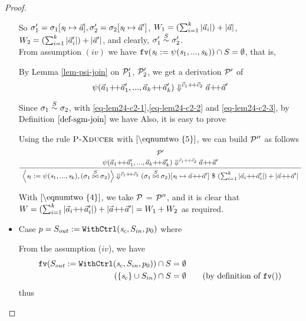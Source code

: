 \begin{proof}
\begin{itemize}
	So  $\sgm_1' = \sgm_1[\s_l \|-> \a], \sgm_2' = \sgm_2[\s_l \|-> \a']$, $W_1 = (\sum_{i=1}^{k}|\vec a_i|) + |\vec a|$, $W_2 = (\sum_{i=1}^{k}|\vec a'_i|) + |\vec a'|$, and clearly, $\sigma_1' \stackrel{S}{\sim} \sigma_2'$. \\
	
	From assumption $(iv)$ we have $\mathtt{fv}(\mathit{s}_l := \psi(\mathit{s}_1,...,\mathit{s}_k)) \cap S = \emptyset$,
    that is, 

    
    By Lemma \ref{lem-psi-join} on $\mathcal{P}'_{1}$, $\mathcal{P}'_{2}$, we get a derivation $\mathcal{P}'$ of 
    \[ \sevalfg{\lcall}{\a_1  {\++} \a_1',...,\a_k {\++} \a_k' } 
             {\c_1 {\++} \c_2} {\a {\++} \a'} \]
    
    Since $\sigma_1 \stackrel{S}{\sim} \sigma_2$, 
    with \eqref{eq-lem24-c2-1},\eqref{eq-lem24-c2-2} and \eqref{eq-lem24-c2-3}, 
    by Definition $\ref{def-sgm-join}$ we have
 	Also, it is easy to prove 
 
    Using the rule $\textsc{P-Xducer}$ with $\eqref{\eqnumtwo{5}}$, we can build $\mathcal{P}''$ as follows
   	$$\PT{\UCN{\MP'}{\sevalfg{\lcall}{\a_1  {\++} \a_1',...,\a_k {\++} \a_k' } 
   			{\c_1 {\++} \c_2} {\a {\++} \a'}}
    	\UC{\seval{\casetwo}{\sgmx}{\c_1 {\++} \c_2}{\sgmx[\s_l \|-> \a {\++} \a']}{(\sum_{i=1}^{k}|\a_i{\++}\a'_i|) + |\a{\++} \a'|}}
    } $$
   
   
    With $\eqref{\eqnumtwo{4}}$, we take $\mathcal{P}$  = $\mathcal{P}''$,
    and it is clear that $W = (\sum_{i=1}^{k}|\a_i{\++}\a'_i|) + |\a{\++} \a'| = W_1 + W_2$ as required.
 
   	

\item Case $p = S_{out} := \mathtt{WithCtrl}(\mathit{s}_c,S_{in},p_0)$ where  
\def\eqnumthree#1{eq-lem24-c3-{#1}}


\def\casethree{\withctrl{\s_c}{p_0}{\Sin}{\Sout}}

	From the assumption ($iv$), we have 
	\begin{align*}
	\FV{\casethree} \cap \S & = \emptyset \\
	(\{\s_c\} \cup \Sin) \cap \S & = \emptyset \tag{by definition of $\FV{}$} 
	\end{align*}
	thus 
	

\end{itemize}
\end{proof}
